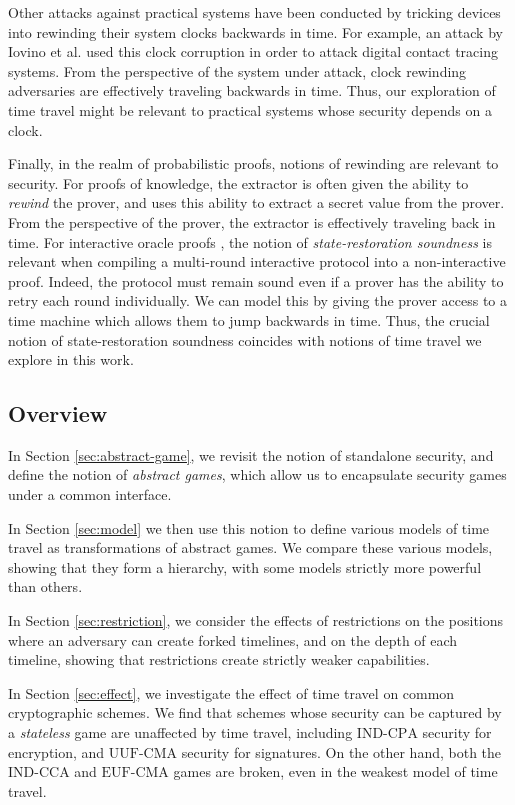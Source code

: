 Other attacks against practical systems have been conducted by
tricking devices into rewinding their system clocks backwards in time.
For example, an attack by Iovino et al. \cite{ivv20} used this
clock corruption in order to attack digital contact tracing systems.
From the perspective of the system under attack, clock rewinding
adversaries are effectively traveling backwards in time.
Thus, our exploration of time travel might be relevant to practical
systems whose security depends on a clock.

Finally, in the realm of probabilistic proofs, notions of rewinding
are relevant to security.
For proofs of knowledge, the extractor is often given the ability
to \emph{rewind} the prover, and uses this ability to extract
a secret value from the prover.
From the perspective of the prover, the extractor is effectively traveling
back in time.
For interactive oracle proofs \cite{bcs16}, the notion
of \emph{state-restoration soundness} is relevant when compiling
a multi-round interactive protocol into a non-interactive proof.
Indeed, the protocol must remain sound even if a prover has
the ability to retry each round individually.
We can model this by giving the prover access to a time machine
which allows them to jump backwards in time.
Thus, the crucial notion of state-restoration soundness
coincides with notions of time travel we explore
in this work.

\subsection{Overview}

In Section \ref{sec:abstract-game}, we revisit the notion of standalone security, and define
the notion of \emph{abstract games}, which allow us to encapsulate
security games under a common interface.

In Section \ref{sec:model} we then use this notion to define various models of time travel as
transformations of abstract games.
We compare these various models, showing that they form a hierarchy,
with some models strictly more powerful than others.

In Section \ref{sec:restriction}, we consider the effects
of restrictions on the positions where an adversary can create forked
timelines, and on the depth of each timeline, showing that restrictions
create strictly weaker capabilities.

In Section \ref{sec:effect}, we investigate the effect of time
travel on common cryptographic schemes.
We find that schemes whose security can be captured by a \emph{stateless}
game are unaffected by time travel, including $\text{IND-CPA}$
security for encryption, and $\text{UUF-CMA}$ security for signatures.
On the other hand, both the $\text{IND-CCA}$ and $\text{EUF-CMA}$ games
are broken, even in the weakest model of time travel.

